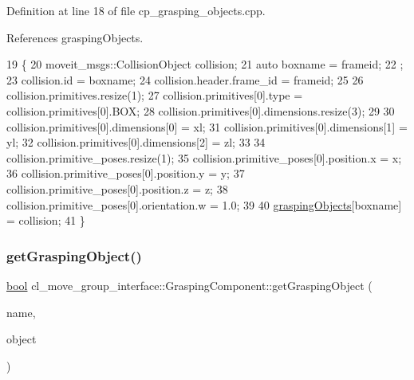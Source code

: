 Definition at line 18 of file cp\+\_\+grasping\+\_\+objects.\+cpp.



References grasping\+Objects.


\begin{DoxyCode}
19    \{
20       moveit\_msgs::CollisionObject collision;
21       \textcolor{keyword}{auto} boxname = frameid;
22       ;
23       collision.id = boxname;
24       collision.header.frame\_id = frameid;
25 
26       collision.primitives.resize(1);
27       collision.primitives[0].type = collision.primitives[0].BOX;
28       collision.primitives[0].dimensions.resize(3);
29 
30       collision.primitives[0].dimensions[0] = xl;
31       collision.primitives[0].dimensions[1] = yl;
32       collision.primitives[0].dimensions[2] = zl;
33 
34       collision.primitive\_poses.resize(1);
35       collision.primitive\_poses[0].position.x = x;
36       collision.primitive\_poses[0].position.y = y;
37       collision.primitive\_poses[0].position.z = z;
38       collision.primitive\_poses[0].orientation.w = 1.0;
39 
40       \hyperlink{classcl__move__group__interface_1_1GraspingComponent_a5e0364a3b76738fb263b11c4e1ef56cc}{graspingObjects}[boxname] = collision;
41    \}
\end{DoxyCode}
\mbox{\label{classcl__move__group__interface_1_1GraspingComponent_a283b379a7b7ad91c69ee94a057730165}} 
\subsubsection{\texorpdfstring{get\+Grasping\+Object()}{getGraspingObject()}}
{\footnotesize\ttfamily \hyperlink{classbool}{bool} cl\+\_\+move\+\_\+group\+\_\+interface\+::\+Grasping\+Component\+::get\+Grasping\+Object (\begin{DoxyParamCaption}\item[{std\+::string}]{name,  }\item[{moveit\+\_\+msgs\+::\+Collision\+Object \&}]{object }\end{DoxyParamCaption})}



